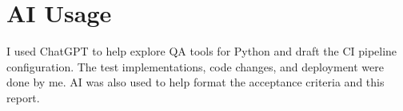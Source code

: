 \documentclass[11pt, a4paper]{article}
\begin{document}

\section{AI Usage}

I used ChatGPT to help explore QA tools for Python and draft the CI pipeline configuration. The test implementations, code changes, and deployment were done by me. AI was also used to help format the acceptance criteria and this report.
\end{document}
